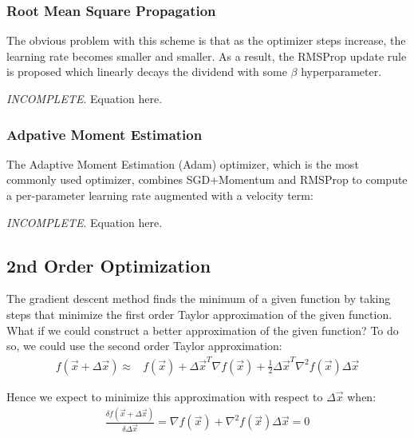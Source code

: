 \documentclass[paper=a4, fontsize=12pt]{scrartcl} %
\numberwithin{equation}{section} %
\numberwithin{figure}{section} %
\numberwithin{table}{section} %
\begin{document}
\subsubsection{Root Mean Square Propagation}

The obvious problem with this scheme is that as the optimizer steps increase, the learning rate becomes smaller and smaller. As a result, the RMSProp update rule is proposed which linearly decays the dividend with some $\beta$ hyperparameter.

\textit{INCOMPLETE}. Equation here.

\subsubsection{Adpative Moment Estimation}

The Adaptive Moment Estimation (Adam) optimizer, which is the most commonly used optimizer, combines SGD+Momentum and RMSProp to compute a 
per-parameter learning rate augmented with a velocity term:

\textit{INCOMPLETE}. Equation here.

\pagebreak


\subsection{2nd Order Optimization}

The gradient descent method finds the minimum of a given function by taking steps that minimize the first order Taylor 
approximation of the given function. What if we could construct a better approximation of the given function? To do so, we could use the 
second order Taylor approximation:
\begin{align*}
    f(\vec{x} + \Delta \vec{x}) \approx &f(\vec{x}) + \Delta \vec{x}^T \nabla f(\vec{x}) + \frac{1}{2} \Delta \vec{x}^T \nabla^2 f(\vec{x}) \Delta \vec{x}
\end{align*}

Hence we expect to minimize this approximation with respect to $\Delta \vec{x}$ when:
\begin{align*}
    \frac{\delta f(\vec{x} + \Delta \vec{x})}{\delta \Delta \vec{x}} = \nabla f(\vec{x}) + \nabla^2 f(\vec{x}) \Delta \vec{x} = 0
\end{align*}
\end{document}
